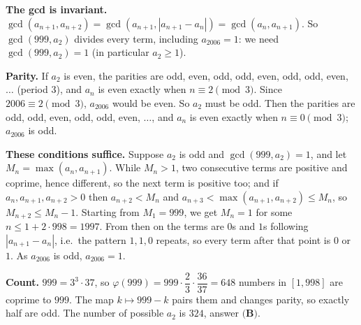 \textbf{The gcd is invariant.} $\gcd(a_{n+1},a_{n+2})=\gcd(a_{n+1},|a_{n+1}-a_n|)=\gcd(a_n,a_{n+1})$. So $\gcd(999,a_2)$ divides every term, including $a_{2006}=1$: we need $\gcd(999,a_2)=1$ (in particular $a_2\ge1$).

\textbf{Parity.} If $a_2$ is even, the parities are odd, even, odd, odd, even, odd, odd, even, $\dots$ (period $3$), and $a_n$ is even exactly when $n\equiv2\pmod3$. Since $2006\equiv2\pmod3$, $a_{2006}$ would be even. So $a_2$ must be odd. Then the parities are odd, odd, even, odd, odd, even, $\dots$, and $a_n$ is even exactly when $n\equiv0\pmod3$; $a_{2006}$ is odd.

\textbf{These conditions suffice.} Suppose $a_2$ is odd and $\gcd(999,a_2)=1$, and let $M_n=\max(a_n,a_{n+1})$. While $M_n>1$, two consecutive terms are positive and coprime, hence different, so the next term is positive too; and if $a_n,a_{n+1},a_{n+2}>0$ then $a_{n+2}<M_n$ and $a_{n+3}<\max(a_{n+1},a_{n+2})\le M_n$, so $M_{n+2}\le M_n-1$. Starting from $M_1=999$, we get $M_n=1$ for some $n\le1+2\cdot998=1997$. From then on the terms are $0$s and $1$s following $|a_{n+1}-a_n|$, i.e.\ the pattern $1,1,0$ repeats, so every term after that point is $0$ or $1$. As $a_{2006}$ is odd, $a_{2006}=1$.

\textbf{Count.} $999=3^3\cdot37$, so $\varphi(999)=999\cdot\dfrac{2}{3}\cdot\dfrac{36}{37}=648$ numbers in $[1,998]$ are coprime to $999$. The map $k\mapsto999-k$ pairs them and changes parity, so exactly half are odd. The number of possible $a_2$ is $\boxed{324}$, answer $\textbf{(B)}$.
